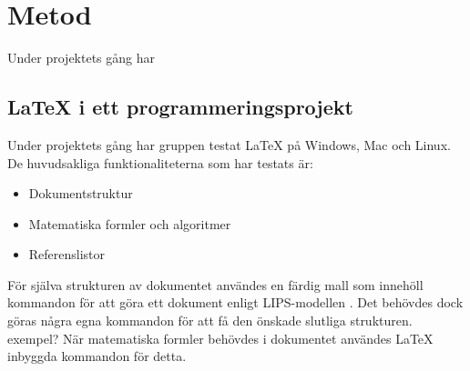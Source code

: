 \section{Metod}
Under projektets gång har  

\subsection{{\LaTeX} i ett programmeringsprojekt}
Under projektets gång har gruppen testat {\LaTeX} på Windows, Mac och Linux. De huvudsakliga funktionaliteterna som har testats är: 
\begin{itemize}
\item Dokumentstruktur
\item Matematiska formler och algoritmer
\item Referenslistor
\end{itemize}  
För själva strukturen av dokumentet användes en färdig mall som innehöll kommandon för att göra ett dokument enligt LIPS-modellen \citep{lips}. Det behövdes dock göras några egna kommandon för att få den önskade slutliga strukturen. exempel?
\newline
\newline
När matematiska formler behövdes i dokumentet användes {\LaTeX} inbyggda kommandon för detta. 
    



